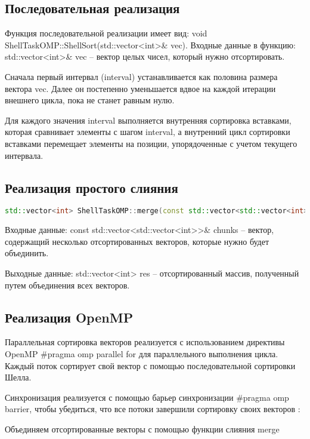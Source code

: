 \documentclass[]{article}
\theoremstyle{remark}
\theoremstyle{definition}
\newcommand{\cpp}{\textit{}}
\begin{document}
\subsection{Последовательная реализация}

\par Функция последовательной реализации имеет вид: \cpp{void ShellTaskOMP::ShellSort(std::vector<int>\& vec)}. Входные данные в функцию: \cpp{std::vector<int>\& vec} -- вектор целых чисел, который нужно отсортировать.
\par Сначала первый интервал (\cpp{interval}) устанавливается как половина размера вектора \cpp{vec}. Далее он постепенно уменьшается вдвое на каждой итерации внешнего цикла, пока не станет равным нулю.
\par Для каждого значения \cpp{interval} выполняется внутренняя сортировка вставками, которая сравнивает элементы с шагом \cpp{interval}, а внутренний цикл сортировки вставками перемещает элементы на позиции, упорядоченные с учетом текущего интервала.


\subsection{Реализация простого слияния}

\begin{lstlisting}[language=C++]
std::vector<int> ShellTaskOMP::merge(const std::vector<std::vector<int>>& chunks):
\end{lstlisting}

\par Входные данные: \cpp{const std::vector<std::vector<int>>\& chunks} -- вектор, содержащий несколько отсортированных векторов, которые нужно будет объединить.

\par Выходные данные: \cpp{std::vector<int> res} -- отсортированный массив, полученный путем объединения всех векторов.


\subsection{Реализация OpenMP}

\par Параллельная сортировка векторов реализуется с использованием директивы OpenMP \cpp{\#pragma omp parallel for} для параллельного выполнения цикла. Каждый поток сортирует свой вектор с помощью последовательной сортировки Шелла.
\par Синхронизация реализуется с помощью барьер синхронизации \cpp{\#pragma omp barrier}, чтобы убедиться, что все потоки завершили сортировку своих векторов :
\par  Объединяем отсортированные векторы с помощью функции слияния \cpp{merge}
\end{document}
